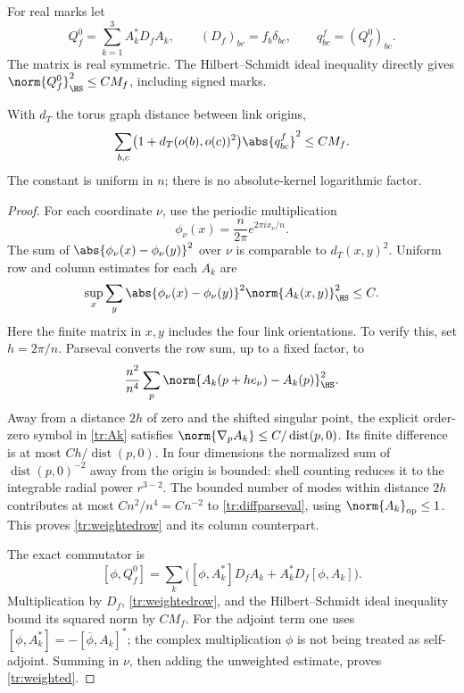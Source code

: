For real marks let
\begin{equation}
 Q_f^0=\sum_{k=1}^3A_k^*D_fA_k,\qquad (D_f)_{bc}=f_b\delta_{bc},
 \qquad q^f_{bc}=(Q_f^0)_{bc}.
 \label{tr:Qflat}
\end{equation}
The matrix is real symmetric. The Hilbert--Schmidt ideal inequality directly
gives \(\norm{Q_f^0}_{\HS}^2\le CM_f\), including signed marks.

\begin{lemma}
\label{tr:weightedHS}
With \(d_T\) the torus graph distance between link origins,
\begin{equation}
 \sum_{b,c}\bigl(1+d_T(o(b),o(c))^2\bigr)\abs{q^f_{bc}}^2
 \le CM_f.
 \label{tr:weighted}
\end{equation}
The constant is uniform in \(n\); there is no absolute-kernel logarithmic
factor.
\end{lemma}

\begin{proof}
For each coordinate \(\nu\), use the periodic multiplication
\[
 \phi_\nu(x)=\frac{n}{2\pi}e^{2\pi ix_\nu/n}.
\]
The sum of \(\abs{\phi_\nu(x)-\phi_\nu(y)}^2\) over \(\nu\) is comparable
to \(d_T(x,y)^2\). Uniform row and column estimates for each \(A_k\) are
\begin{equation}
 \sup_x\sum_y\abs{\phi_\nu(x)-\phi_\nu(y)}^2
                   \norm{A_k(x,y)}_{\HS}^2\le C.
 \label{tr:weightedrow}
\end{equation}
Here the finite matrix in \(x,y\) includes the four link orientations.
To verify this, set \(h=2\pi/n\). Parseval converts the row sum, up to a
fixed factor, to
\begin{equation}
 \frac{n^2}{n^4}\sum_p
       \norm{A_k(p+he_\nu)-A_k(p)}_{\HS}^2.
 \label{tr:diffparseval}
\end{equation}
Away from a distance \(2h\) of zero and the shifted singular point, the
explicit order-zero symbol in \eqref{tr:Ak} satisfies
\(\norm{\nabla_pA_k}\le C/\operatorname{dist}(p,0)\).
Its finite difference is at most \(Ch/\operatorname{dist}(p,0)\).
In four dimensions the normalized sum of
\(\operatorname{dist}(p,0)^{-2}\) away from the origin is bounded: shell
counting reduces it to the integrable radial power \(r^{3-2}\).
The bounded number of modes within distance \(2h\) contributes at most
\(Cn^2/n^4=Cn^{-2}\) to \eqref{tr:diffparseval}, using
\(\norm{A_k}_{\rm op}\le1\). This proves \eqref{tr:weightedrow} and its
column counterpart.

The exact commutator is
\[
 [\phi,Q_f^0]=\sum_k\bigl([\phi,A_k^*]D_fA_k
                          +A_k^*D_f[\phi,A_k]\bigr).
\]
Multiplication by \(D_f\), \eqref{tr:weightedrow}, and the
Hilbert--Schmidt ideal inequality bound its squared norm by \(CM_f\).
For the adjoint term one uses
\([\phi,A_k^*]=-[\overline\phi,A_k]^*\); the complex multiplication
\(\phi\) is not being treated as self-adjoint. Summing in \(\nu\), then
adding the unweighted estimate, proves \eqref{tr:weighted}.
\end{proof}

